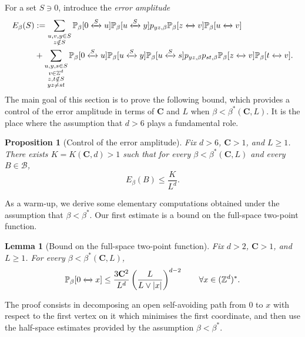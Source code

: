 \documentclass[11pt,a4paper]{article}
\numberwithin{equation}{section}
\theoremstyle{plain}
\newtheorem{Lem}[Thm]{Lemma}
\newtheorem{Prop}[Thm]{Proposition}
\theoremstyle{definition}
\newcommand\bfC{\mathbf{C}}
\newcommand{\connect}{\xleftrightarrow}
\begin{document}
For a set $S\ni 0$, introduce the {\em error amplitude} \begin{align}
	E_\beta(S)&:=\sum_{\substack{u,v,y\in S\\z\notin S}}\mathbb P_{\beta}[0\connect{S\:}u]\mathbb P_{\beta}[u\connect{S\:}y]p_{yz,\beta}\mathbb P_{\beta}[z\connect{\:}v]\mathbb P_{\beta}[u\connect{\:}v]\label{eq: definition E(o;u,v)}\\
&+\sum_{\substack{u,y,s\in S\\ v\in \mathbb Z^d\\ z,t\notin S\\ yz\neq st}}\mathbb P_\beta[0\connect{S\:}u]\mathbb P_\beta[u\connect{S\:}y]\mathbb P_\beta[u\connect{S\:}s]p_{yz,\beta}p_{st,\beta}\mathbb P_\beta[z\connect{\:}v]\mathbb P_\beta[t\connect{\:}v]. \notag
\end{align}
The main goal of this section is to prove the following bound, which provides a control of the error amplitude in terms of $\bfC$ and $L$ when $\beta<\beta^*(\bfC,L)$.
It is the place where the assumption that $d>6$ plays a fundamental role.
\begin{Prop}[Control of the error amplitude]\label{lem: error amplitude perco} Fix $d>6$, $\bfC>1$, and $L\geq 1$. There exists $K=K(\bfC,d)>1$ such that for every $\beta<\beta^*(\bfC,L)$ and every $B\in \mathcal B$,
\begin{equation}
	E_\beta(B)\leq \frac{K}{L^d}.
\end{equation}
\end{Prop}


As a warm-up, we derive some elementary computations obtained under the assumption that $\beta<\beta^*$. Our first estimate is a bound on the full-space two-point function.

\begin{Lem}[Bound on the full-space two-point function]\label{lem: full plane 2pt function out of halfplane one perco} Fix $d>2$, $\bfC>1$, and $L\geq 1$. For every $\beta<\beta^*(\bfC,L)$,
\begin{equation}\label{eq: full plane estimate from half plane perco}
\mathbb P_{\beta}[0\connect{}x]\le \frac{3\bfC^2}{L^d}\left(\frac{L}{L\vee|x|}\right)^{d-2} \qquad\forall x\in (\mathbb Z^d)^*.
\end{equation}
\end{Lem}

The proof consists in decomposing an open self-avoiding path from $0$ to $x$ with respect to the first vertex on it which minimises the first coordinate, and then use the half-space estimates provided by the assumption $\beta<\beta^*$.
\end{document}
